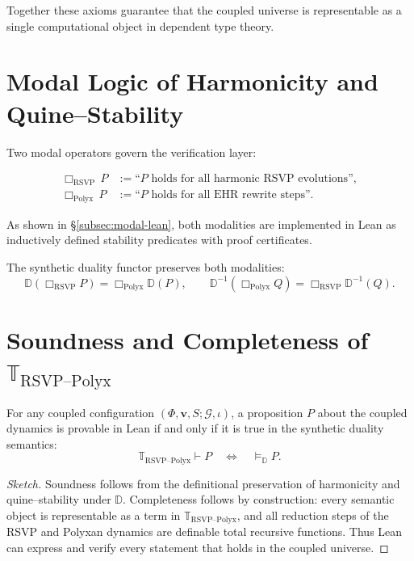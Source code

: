 Together these axioms guarantee that the coupled universe is representable as a single
computational object in dependent type theory.

\section{Modal Logic of Harmonicity and Quine--Stability}

Two modal operators govern the verification layer:

\begin{align}
\Box_{\mathrm{RSVP}}\,P 
  &:= \text{``$P$ holds for all harmonic RSVP evolutions''}, \\
\Box_{\mathrm{Polyx}}\,P
  &:= \text{``$P$ holds for all EHR rewrite steps''}.
\end{align}

As shown in §\ref{subsec:modal-lean}, both modalities are implemented in Lean
as inductively defined stability predicates with proof certificates.

The synthetic duality functor preserves both modalities:
\[
\mathbb{D}(\Box_{\mathrm{RSVP}} P) = \Box_{\mathrm{Polyx}}\mathbb{D}(P),
\qquad
\mathbb{D}^{-1}(\Box_{\mathrm{Polyx}} Q) = \Box_{\mathrm{RSVP}}\mathbb{D}^{-1}(Q).
\]

\section{Soundness and Completeness of $\mathbb{T}_{\mathrm{RSVP\text{--}Polyx}}$}

\begin{theorem}
For any coupled configuration $(\Phi,\mathbf{v},S;\mathcal{G},\iota)$,
a proposition $P$ about the coupled dynamics is provable in Lean
if and only if it is true in the synthetic duality semantics:
\[
\mathbb{T}_{\mathrm{RSVP\text{--}Polyx}} \vdash P
\quad\Longleftrightarrow\quad
\models_{\mathbb{D}} P.
\]
\end{theorem}

\begin{proof}[Sketch]
Soundness follows from the definitional preservation of harmonicity and quine--stability under $\mathbb{D}$.  
Completeness follows by construction: every semantic object is representable as a term in $\mathbb{T}_{\mathrm{RSVP\text{--}Polyx}}$, and all reduction steps of the RSVP and Polyxan dynamics are definable total recursive functions.  
Thus Lean can express and verify every statement that holds in the coupled universe.
\end{proof}

